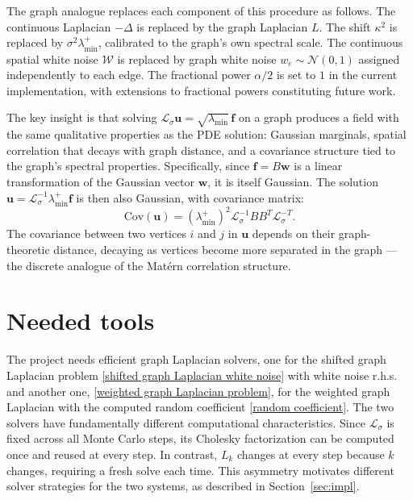 \documentclass[a4paper,12pt]{amsart}
\numberwithin{equation}{section}
\def\bu{{\mathbf u}}
\def\bw{{\mathbf w}}
\def\bbf{{\mathbf f}}
\newcommand{\N}{{\mathcal N}}
\renewcommand{\L}{{\mathcal L}}
\begin{document}
The graph analogue replaces each component of this procedure as follows. 
The continuous Laplacian $-\Delta$ is replaced by the graph Laplacian $L$. 
The shift $\kappa^2$ is replaced by $\sigma^2 \lambda^+_{\min}$, calibrated 
to the graph's own spectral scale. The continuous spatial white noise 
$\mathcal{W}$ is replaced by graph white noise $w_e \sim \N(0,1)$ assigned 
independently to each edge. The fractional power $\alpha/2$ is set to $1$ 
in the current implementation, with extensions to fractional powers 
constituting future work.

The key insight is that solving $\L_\sigma \bu = \sqrt{\lambda_{\min}} \, \bbf$ 
on a graph produces a field with the same qualitative properties as the 
PDE solution: Gaussian marginals, spatial correlation that decays with 
graph distance, and a covariance structure tied to the graph's spectral 
properties. Specifically, since $\bbf = B\bw$ is a linear transformation 
of the Gaussian vector $\bw$, it is itself Gaussian. The solution 
$\bu = \L_\sigma^{-1} \lambda^+_{\min} \bbf$ is then also Gaussian, 
with covariance matrix:
\begin{equation}
\text{Cov}(\bu) = (\lambda^+_{\min})^2 \L_\sigma^{-1} B B^T \L_\sigma^{-T}.
\end{equation}
The covariance between two vertices $i$ and $j$ in $\bu$ depends on their 
graph-theoretic distance, decaying as vertices become more separated in the 
graph — the discrete analogue of the Mat\'ern correlation structure.

\section{Needed tools}

The project needs efficient graph Laplacian solvers, one for the shifted 
graph Laplacian problem \eqref{shifted graph Laplacian white noise} with 
white noise r.h.s. and another one, \eqref{weighted graph Laplacian problem}, 
for the weighted graph Laplacian with the computed random coefficient 
\eqref{random coefficient}. The two solvers have fundamentally different 
computational characteristics. Since $\L_\sigma$ is fixed across all Monte 
Carlo steps, its Cholesky factorization can be computed once and reused at 
every step. In contrast, $L_k$ changes at every step because $k$ changes, 
requiring a fresh solve each time. This asymmetry motivates different solver 
strategies for the two systems, as described in Section~\ref{sec:impl}.
\end{document}
